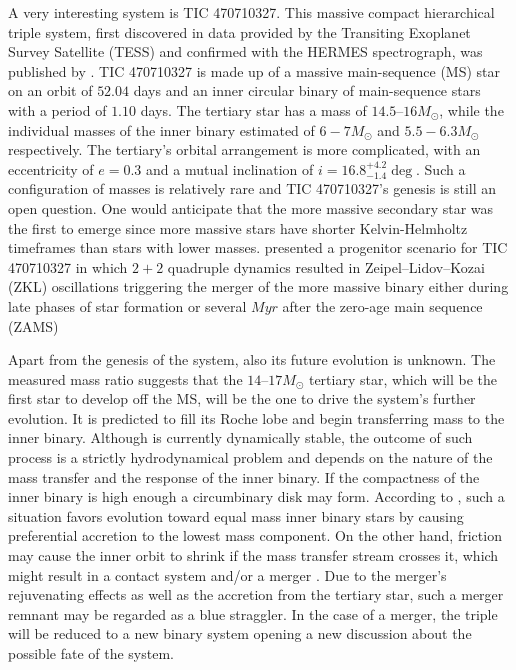 \documentclass{uva-inf-article}
\numberwithin{equation}{section}
\begin{document}
A very interesting system is TIC 470710327. This massive compact hierarchical triple system, first discovered in data provided by the Transiting Exoplanet Survey Satellite (TESS) and confirmed with the HERMES spectrograph, was published by \cite{eisner2022planet}. TIC 470710327 is made up of a massive main-sequence (MS) star on an orbit of $52.04$ days and an inner circular binary of main-sequence stars with a period of $1.10$ days.  The tertiary star has a mass of $14.5–16 M_{\odot}$, while the individual masses of the inner binary estimated of $6-7 M_{\odot}$ and $5.5-6.3 M_{\odot}$ respectively. The tertiary's orbital arrangement is more complicated, with an eccentricity of $e = 0.3$ and a mutual inclination of $i = 16.8^{+4.2}_{-1.4} \deg$. Such a configuration of masses is relatively rare \citep{de2014evolution} and TIC 470710327's genesis is still an open question. One would anticipate that the more massive secondary star was the first to emerge since more massive stars have shorter Kelvin-Helmholtz timeframes than stars with lower masses. \cite{vigna2022mergers} presented a progenitor scenario for TIC 470710327 in which $2+2$ quadruple dynamics resulted in Zeipel–Lidov–Kozai (ZKL) oscillations triggering the merger of the more massive binary either during late phases of star formation or several $Myr$ after the zero-age main sequence (ZAMS)

Apart from the genesis of the system, also its future evolution is unknown. The measured mass ratio suggests that the $14–17 M_{\odot}$ tertiary star, which will be the first star to develop off the MS, will be the one to drive the system's further evolution. It is predicted to fill its Roche lobe and begin transferring mass to the inner binary. Although is currently dynamically stable, the outcome of such process is a strictly hydrodynamical problem \citep{de2014evolution} and depends on the nature of the mass transfer and the response of the inner binary. If the compactness of the inner binary is high enough a circumbinary disk may form. According to \cite{leigh2020mergers}, such a situation favors evolution toward equal mass inner binary stars by causing preferential accretion to the lowest mass component. On the other hand, friction may cause the inner orbit to shrink if the mass transfer stream crosses it, which might result in a contact system and/or a merger \citep{de2014evolution}. Due to the merger's rejuvenating effects as well as the accretion from the tertiary star, such a merger remnant may be regarded as a blue straggler. In the case of a merger, the triple will be reduced to a new binary system opening a new discussion about the possible fate of the system.
\end{document}
